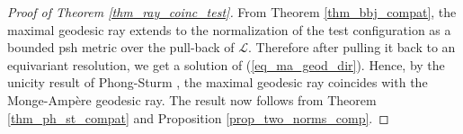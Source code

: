 \documentclass[12pt]{article}
\numberwithin{equation}{section}
\theoremstyle{theorem}
\theoremstyle{definition}
\theoremstyle{remark}
\begin{document}
	\begin{proof}[Proof of Theorem \ref{thm_ray_coinc_test}]
		From Theorem \ref{thm_bbj_compat}, the maximal geodesic ray extends to the normalization of the test configuration as a bounded psh metric over the pull-back of $\mathcal{L}$. 
		Therefore after pulling it back to an equivariant resolution, we get a solution of (\ref{eq_ma_geod_dir}).
		Hence, by the unicity result of Phong-Sturm \cite[Theorem 5]{PhongSturmRegul}, the maximal geodesic ray coincides with the Monge-Ampère geodesic ray.
		The result now follows from Theorem \ref{thm_ph_st_compat} and Proposition \ref{prop_two_norms_comp}.
	\end{proof}




		

\Addresses
\end{document}
